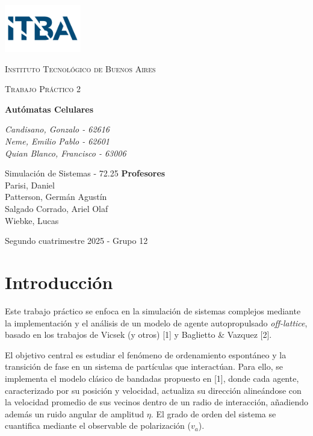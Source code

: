\documentclass{article}
\begin{document}
\begin{titlepage}
  \centering
  \includegraphics[width=0.25\textwidth]{ITBA_logo.png}\par\vspace{1cm}
  {\textsc{Instituto Tecnológico de Buenos Aires} \par}
    \vspace{1cm}
    {\Large \textsc{Trabajo Práctico 2}\par}
    \vspace{1.5cm}
    {\huge\bfseries Autómatas Celulares\par}
    \vspace{2cm}
    {\Large\itshape Candisano, Gonzalo - 62616\\
	  Neme, Emilio Pablo - 62601\\
	Quian Blanco, Francisco - 63006\par}
    \vfill
    Simulación de Sistemas - 72.25
    \vfill
    \noindent\textbf{Profesores} \\
Parisi, Daniel \\
Patterson, Germán Agustín \\
Salgado Corrado, Ariel Olaf \\
Wiebke, Lucas
\vfill
    {\large Segundo cuatrimestre 2025 - Grupo 12\par}
\end{titlepage}

\section{Introducción}
Este trabajo práctico se enfoca en la simulación de sistemas complejos mediante la implementación y el análisis de un modelo de agente autopropulsado \textit{off-lattice}, basado en los trabajos de Vicsek (y otros) [1] y Baglietto \& Vazquez [2].

\medskip

El objetivo central es estudiar el fenómeno de ordenamiento espontáneo y la transición de fase en un sistema de partículas que interactúan. Para ello, se implementa el modelo clásico de bandadas propuesto en [1], donde cada agente, caracterizado por su posición y velocidad, actualiza su dirección alineándose con la velocidad promedio de sus vecinos dentro de un radio de interacción, añadiendo además un ruido angular de amplitud $\eta$. El grado de orden del sistema se cuantifica mediante el observable de polarización ($v_a$).
\end{document}
